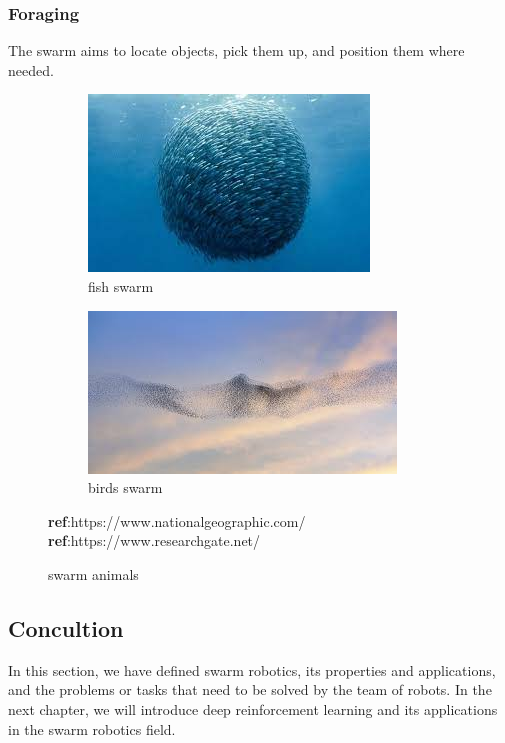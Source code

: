 \documentclass[12pt]{extarticle}
\begin{document}
\subsubsection{Foraging}
The swarm aims to locate objects, pick them up, and position them where needed.





\begin{figure}
\centering

\begin{subfigure}{.5\textwidth}
  \centering
  \includegraphics[width=.8\linewidth]{swarmfish}
  \caption{fish swarm }
  \label{fig:sub1}
\end{subfigure}%
\begin{subfigure}{.5\textwidth}
  \centering
  \includegraphics[width=.8\linewidth]{swarmbirds }
  \caption{birds swarm  }
  \label{fig:sub2}
\end{subfigure}
\caption{swarm animals}
\textbf{ref}:https://www.nationalgeographic.com/
\textbf{ref}:https://www.researchgate.net/
\label{fig:test}
\end{figure}



\subsection{Concultion}
In this section, we have defined swarm robotics, its properties and applications, and the problems or tasks that need to be solved by the team of robots. In the next chapter, we will introduce deep reinforcement learning and its applications in the swarm robotics field.
\end{document}
